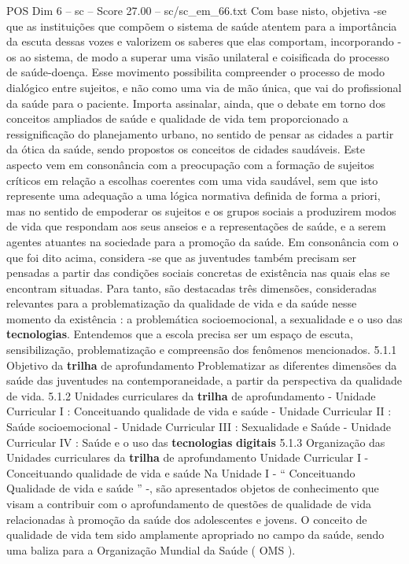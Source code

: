 \begin{textsample}{POS Dim 6 – sc – Score 27.00 – sc/sc\_em\_66.txt}
Com base nisto, objetiva -se que as instituições que compõem o sistema de saúde atentem para a importância da escuta dessas vozes e valorizem os saberes que elas comportam, incorporando -os ao sistema, de modo a superar uma visão unilateral e coisificada do processo de saúde-doença.
Esse movimento possibilita compreender o processo de modo dialógico entre sujeitos, e não como uma via de mão única, que vai do profissional da saúde para o paciente.
Importa assinalar, ainda, que o debate em torno dos conceitos ampliados de saúde e qualidade de vida tem proporcionado a ressignificação do planejamento urbano, no sentido de pensar as cidades a partir da ótica da saúde, sendo propostos os conceitos de cidades saudáveis.
Este aspecto vem em consonância com a preocupação com a formação de sujeitos críticos em relação a escolhas coerentes com uma vida saudável, sem que isto represente uma adequação a uma lógica normativa definida de forma a priori, mas no sentido de empoderar os sujeitos e os grupos sociais a produzirem modos de vida que respondam aos seus anseios e a representações de saúde, e a serem agentes atuantes na sociedade para a promoção da saúde.
Em consonância com o que foi dito acima, considera -se que as juventudes também precisam ser pensadas a partir das condições sociais concretas de existência nas quais elas se encontram situadas.
Para tanto, são destacadas três dimensões, consideradas relevantes para a problematização da qualidade de vida e da saúde nesse momento da existência : a problemática socioemocional, a sexualidade e o uso das \textbf{tecnologias}.
Entendemos que a escola precisa ser um espaço de escuta, sensibilização, problematização e compreensão dos fenômenos mencionados. 5.1.1 Objetivo da \textbf{trilha} de aprofundamento Problematizar as diferentes dimensões da saúde das juventudes na contemporaneidade, a partir da perspectiva da qualidade de vida. 5.1.2 Unidades curriculares da \textbf{trilha} de aprofundamento - Unidade Curricular I : Conceituando qualidade de vida e saúde - Unidade Curricular II : Saúde socioemocional - Unidade Curricular III : Sexualidade e Saúde - Unidade Curricular IV : Saúde e o uso das \textbf{tecnologias} \textbf{digitais} 5.1.3 Organização das Unidades curriculares da \textbf{trilha} de aprofundamento Unidade Curricular I - Conceituando qualidade de vida e saúde Na Unidade I - “ Conceituando Qualidade de vida e saúde ” -, são apresentados objetos de conhecimento que visam a contribuir com o aprofundamento de questões de qualidade de vida relacionadas à promoção da saúde dos adolescentes e jovens.
O conceito de qualidade de vida tem sido amplamente apropriado no campo da saúde, sendo uma baliza para a Organização Mundial da Saúde ( OMS ).

\end{textsample}
